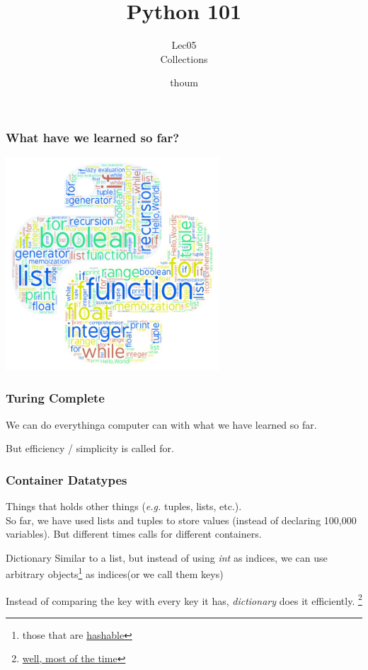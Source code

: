 \documentclass{beamer}
\title{Python 101}
\subtitle{Lec05 \\ Collections}
\author{thoum}
\begin{document}
\frame{\titlepage}

\begin{frame}
\frametitle{What have we learned so far?}
  \begin{center}
  \includegraphics[width=80mm]{../lec04/python_art.png}
  \end{center}
\end{frame}

\begin{frame}
\frametitle{Turing Complete}
  We can do everything\tiny{a computer can} \normalsize with what we have learned so far.
  
  But efficiency / simplicity is called for.
\end{frame}

\begin{frame}
\frametitle{Container Datatypes}
  Things that holds other things (\textit{e.g.} tuples, lists, etc.).\\
  \bigskip
  So far, we have used lists and tuples to store values (instead of declaring
  100,000 variables). But different times calls for different containers.
\end{frame}

\begin{frame}{Dictionary}
  Similar to a list, but instead of using \textit{int} as indices, we can use
  arbitrary objects\footnote{those that are
  \href{https://docs.python.org/2/glossary.html\#term-hashable}{hashable}}
  as indices(or we call them keys)

  Instead of comparing the key with every key it has, \textit{dictionary} does
  it efficiently.
  \footnote{\href{https://en.wikipedia.org/wiki/Collision_(computer_science)}{well, most of the time}}
\end{frame}
\end{document}
